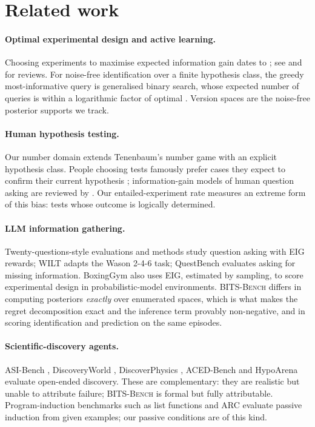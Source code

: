 \documentclass[11pt]{article}
\newcommand{\bench}{\textsc{BITS-Bench}}
\begin{document}
\section{Related work}

\paragraph{Optimal experimental design and active learning.} Choosing experiments to maximise expected
information gain dates to \citet{lindley1956}; see \citet{chaloner1995} and \citet{rainforth2024} for
reviews. For noise-free identification over a finite hypothesis class, the greedy most-informative
query is generalised binary search, whose expected number of queries is within a logarithmic factor of
optimal \citep{dasgupta2004greedy,golovin2011adaptive}. Version spaces \citep{mitchell1982} are the
noise-free posterior supports we track.

\paragraph{Human hypothesis testing.} Our number domain extends Tenenbaum's number game
\citep{tenenbaum1999bayesian} with an explicit hypothesis class. People choosing tests famously prefer
cases they expect to confirm their current hypothesis \citep{wason1960,klayman1987confirmation};
information-gain models of human question asking are reviewed by \citet{coenen2019asking}. Our entailed-experiment
rate measures an extreme form of this bias: tests whose outcome is logically determined.

\paragraph{LLM information gathering.} Twenty-questions-style evaluations and methods
\citep{bedllm2025,asig2026} study question asking with EIG rewards; WILT \citep{banatt2024wilt} adapts
the Wason 2-4-6 task; QuestBench \citep{li2025questbench} evaluates asking for missing information.
BoxingGym \citep{gandhi2025boxinggym} also uses EIG, estimated by sampling, to score experimental design
in probabilistic-model environments. \bench{} differs in computing posteriors \emph{exactly} over
enumerated spaces, which is what makes the regret decomposition exact and the inference term provably
non-negative, and in scoring identification and prediction on the same episodes.

\paragraph{Scientific-discovery agents.} ASI-Bench \citep{asibench2026}, DiscoveryWorld
\citep{jansen2024discoveryworld}, DiscoverPhysics \citep{discoverphysics2026}, ACED-Bench
\citep{acedbench2026} and HypoArena \citep{hypoarena2026} evaluate open-ended discovery. These are
complementary: they are realistic but unable to attribute failure; \bench{} is formal but fully
attributable. Program-induction benchmarks such as list functions \citep{rule2020child} and ARC
\citep{chollet2019measure} evaluate passive induction from given examples; our passive conditions are
of this kind.
\end{document}
